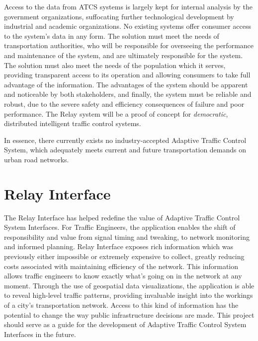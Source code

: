 \documentclass[a4paper,11pt]{report}
\begin{document}
\begin{multicols}{2}
Access to the data from ATCS systems is largely kept for internal analysis by the government organizations, suffocating further technological development by industrial and academic organizations.
No existing systems offer consumer access to the system's data in any form.
The solution must meet the needs of transportation authorities, who will be responsible for overseeing the performance and maintenance of the system, and are ultimately responsible for the system.
The solution must also meet the needs of the population which it serves, providing transparent access to its operation and allowing consumers to take full advantage of the information.
The advantages of the system should be apparent and noticeable by both stakeholders, and finally, the system must be reliable and robust, due to the severe safety and efficiency consequences of failure and poor performance. The Relay system will be a proof of concept for \emph{democratic}, distributed intelligent traffic control systems.

In essence, there currently exists no industry-accepted Adaptive Traffic Control System, which adequately meets current and future transportation demands on urban road networks.

\section{Relay Interface}



The Relay Interface has helped redefine the value of Adaptive Traffic Control System Interfaces. For Traffic Engineers, the application enables the shift of responsibility and value from signal timing and tweaking, to network monitoring and informed planning. Relay Interface exposes rich information which was previously either impossible or extremely expensive to collect, greatly reducing costs associated with maintaining efficiency of the network. This information allows traffic engineers to know exactly what's going on in the network at any moment. Through the use of geospatial data visualizations, the application is able to reveal high-level traffic patterns, providing invaluable insight into the workings of a city's transportation network. Access to this kind of information has the potential to change the way public infrastructure decisions are made. This project should serve as a guide for the development of Adaptive Traffic Control System Interfaces in the future.


\end{multicols}
\end{document}
